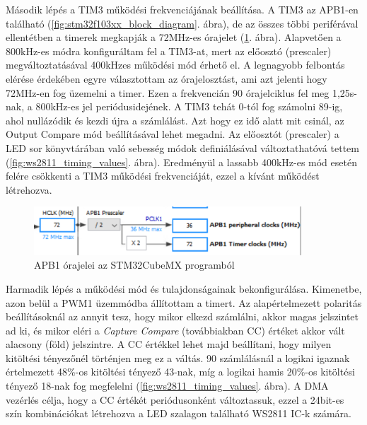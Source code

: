 \documentclass[../main.tex]{subfiles}
\begin{document}
            
            Második lépés a TIM3 működési frekvenciájának beállítása. A TIM3 az APB1-en található (\ref{fig:stm32f103xx_block_diagram}. ábra), de az összes többi periférával ellentétben a timerek megkapják a 72MHz-es órajelet (\ref{fig:tim3_clk_src}. ábra). Alapvetően a 800kHz-es módra konfiguráltam fel a TIM3-at, mert az előosztó (prescaler) megváltoztatásával 400kHzes működési mód érhető el.
            A legnagyobb felbontás elérése érdekében egyre választottam az órajelosztást, ami azt jelenti hogy 72MHz-en fog üzemelni a timer. Ezen a frekvencián 90 órajelciklus fel meg 1,25\micro s-nak, a 800kHz-es jel periódusidejének. A TIM3 tehát 0-tól fog számolni 89-ig, ahol nullázódik és kezdi újra a számlálást. Azt hogy ez idő alatt mit csinál, az Output Compare mód beállításával lehet megadni.
            Az előosztót (prescaler) a LED sor könyvtárában való sebesség módok definiálásával változtathatóvá tettem (\ref{fig:ws2811_timing_values}. ábra). Eredményül a lassabb 400kHz-es mód esetén felére csökkenti a TIM3 működési frekvenciáját, ezzel a kívánt működést létrehozva.
            
            \begin{figure}[h!]
                \centering
                    \includegraphics[width=10cm]{mbed_res/tim3_clock_src}
                \caption{APB1 órajelei az STM32CubeMX programból}
                \label{fig:tim3_clk_src}
            \end{figure}
            
            Harmadik lépés a működési mód és tulajdonságainak bekonfigurálása. Kimenetbe, azon belül a PWM1 üzemmódba állítottam a timert. Az alapértelmezett polaritás beállításoknál az annyit tesz, hogy mikor elkezd számlálni, akkor magas jelszintet ad ki, és mikor eléri a \textit{Capture Compare} (továbbiakban CC) értéket akkor vált alacsony (föld) jelszintre. A CC értékkel lehet majd beállítani, hogy milyen kitöltési tényezőnél történjen meg ez a váltás. 90 számlálásnál a logikai igaznak értelmezett 48\%-os kitöltési tényező 43-nak, míg a logikai hamis 20\%-os kitöltési tényező 18-nak fog megfelelni (\ref{fig:ws2811_timing_values}. ábra). A DMA vezérlés célja, hogy a CC értékét periódusonként változtassuk, ezzel a 24bit-es szín kombinációkat létrehozva a LED szalagon található WS2811 IC-k számára.
            
\end{document}
